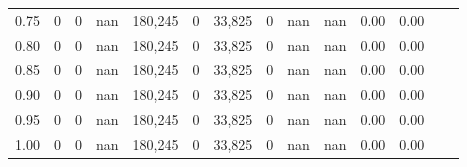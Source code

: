 \begin{tabular}{rrrrrrrrrrrrrr}
0.75 &       0 &       0 &     nan &  180,245 &        0 &  33,825 &       0 &   nan &   nan &  0.00 &      0.00 \\
0.80 &       0 &       0 &     nan &  180,245 &        0 &  33,825 &       0 &   nan &   nan &  0.00 &      0.00 \\
0.85 &       0 &       0 &     nan &  180,245 &        0 &  33,825 &       0 &   nan &   nan &  0.00 &      0.00 \\
0.90 &       0 &       0 &     nan &  180,245 &        0 &  33,825 &       0 &   nan &   nan &  0.00 &      0.00 \\
0.95 &       0 &       0 &     nan &  180,245 &        0 &  33,825 &       0 &   nan &   nan &  0.00 &      0.00 \\
1.00 &       0 &       0 &     nan &  180,245 &        0 &  33,825 &       0 &   nan &   nan &  0.00 &      0.00 \\
\bottomrule
\end{tabular}
